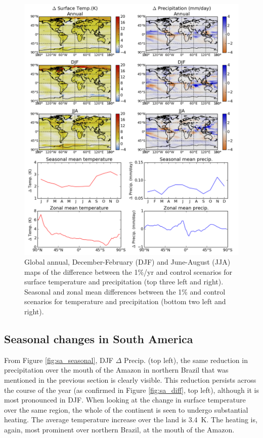 \documentclass{article}
\begin{document}
\begin{figure}[hbp]
    \centering
    \includegraphics[width=\textwidth]{figures/global_temp_precip}
    \caption{Global annual, December-February (DJF) and June-August (JJA) maps of the difference between the 1\%/yr and control scenarios for surface temperature and precipitation (top three left and right). Seasonal and zonal mean differences between the 1\% and control scenarios for temperature and precipitation (bottom two left and right).}
    \label{fig:global_temp_precip}
\end{figure}

\newpage
\subsection{Seasonal changes in South America}
\label{subsec:seasonal_changes}

From Figure \ref{fig:sa_seasonal}, DJF $\Delta$ Precip. (top left), the same reduction in precipitation over the mouth of the Amazon in northern Brazil that was mentioned in the previous section is clearly visible. This reduction persists across the course of the year (as confirmed in Figure \ref{fig:sa_diff}, top left), although it is most pronounced in DJF. When looking at the change in surface temperature over the same region, the whole of the continent is seen to undergo substantial heating. The average temperature increase over the land is \SI{3.4}{K}. The heating is, again, most prominent over northern Brazil, at the mouth of the Amazon.
\end{document}
